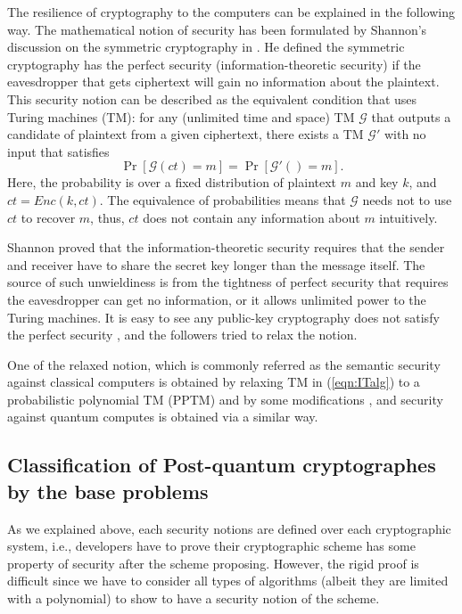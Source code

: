 The resilience of cryptography to the computers can be explained in the following way.
The mathematical notion of security has been formulated by Shannon's discussion on the symmetric cryptography in \cite{Sha49}. 
He defined the symmetric cryptography has the perfect security (information-theoretic security) if the eavesdropper that gets ciphertext will gain no information about the plaintext.
This security notion can be described as the equivalent condition that 
uses Turing machines (TM):
for any (unlimited time and space) TM $\mathcal{G}$ that outputs a candidate of plaintext from a given ciphertext, there exists a TM $\mathcal{G}'$ with no input that satisfies
%
\begin{equation}
	\label{eqn:ITalg}
	\Pr[ \mathcal{G}(ct) = m ] = \Pr [\mathcal{G}'() = m ].
\end{equation}
%
Here, the probability is over a fixed distribution of plaintext $m$ and key $k$, and $ct = Enc(k,ct)$.
The equivalence of probabilities means that $\mathcal{G}$ needs not to use $ct$ to recover $m$, thus, $ct$ does not contain any information about $m$ intuitively.

Shannon proved that the information-theoretic security 
requires that the sender and receiver have to share 
the secret key longer than the message itself.
The source of such unwieldiness is from the tightness of perfect security that requires the eavesdropper can get no information, or it allows unlimited power to the Turing machines.
It is easy to see any public-key cryptography does not satisfy
the perfect security \cite[Sect. 5.5.2]{GolEnc2}, 
and the followers tried to relax the notion.


One of the relaxed notion, which is commonly referred as the semantic security against classical computers is obtained by relaxing TM in (\ref{eqn:ITalg}) to a probabilistic polynomial TM (PPTM) and by some modifications \cite{...}, and security against quantum computes is obtained via a similar way.

\subsection{Classification of Post-quantum cryptographes by the base problems}

As we explained above, each security notions are defined over each cryptographic system, i.e., developers have to prove their cryptographic scheme has some property of security after the scheme proposing.
However, the rigid proof is difficult since we have to consider all types of algorithms (albeit they are limited with a polynomial) to show to have a  security notion of the scheme.

